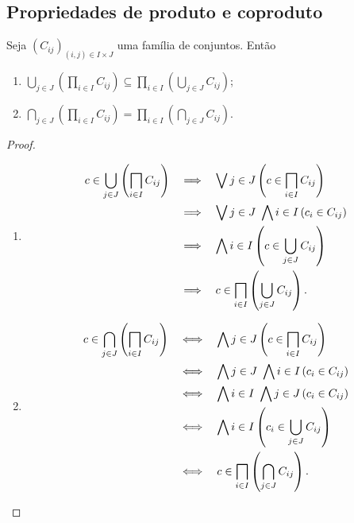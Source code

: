 \cleardoublepage
\subsection{Propriedades de produto e coproduto}

\begin{proposition}
	Seja $(C_{ij})_{(i,j) \in I \times J}$ uma família de conjuntos. Então
	\begin{enumerate}
	\item $\displaystyle \bigcup_{j \in J} \left(\prod_{i \in I} C_{ij}\right) \subseteq \prod_{i \in I} \left(\bigcup_{j \in J} C_{ij}\right)$;
	\item $\displaystyle \bigcap_{j \in J} \left(\prod_{i \in I} C_{ij}\right) = \prod_{i \in I} \left(\bigcap_{j \in J} C_{ij}\right)$.
	\end{enumerate}
\end{proposition}
\begin{proof}
	\begin{enumerate}	
	\item \begin{align*}
	\displaystyle c \in  \bigcup_{j \in J} \left(\prod_{i \in I} C_{ij}\right)
		& \entao \exists j \in J \left(c \in \prod_{i \in I} C_{ij} \right) \\
		& \entao \exists j \in J \ \forall i \in I \left(c_i \in C_{ij} \right) \\
		& \entao \forall i \in I \left(c \in \bigcup_{j \in J} C_{ij} \right) \\
		& \entao  c \in \prod_{i \in I} \left(\bigcup_{j \in J} C_{ij}\right).
	\end{align*}
	
	\item 	
	\begin{align*}
	c \in \displaystyle \bigcap_{j \in J} \left(\prod_{i \in I} C_{ij}\right)
		& \sse \forall j \in J \left(c \in \prod_{i \in I} C_{ij} \right) \\
		& \sse \forall j \in J \ \forall i \in I \left(c_i \in C_{ij} \right) \\
		& \sse \forall i \in I \ \forall j \in J \left(c_i \in C_{ij} \right) \\
		& \sse \forall i \in I \left(c_i \in \bigcup_{j \in J} C_{ij} \right) \\
		& \sse  c \in \prod_{i \in I} \left(\bigcap_{j \in J} C_{ij}\right).
	\end{align*}
	\end{enumerate}
\end{proof}

